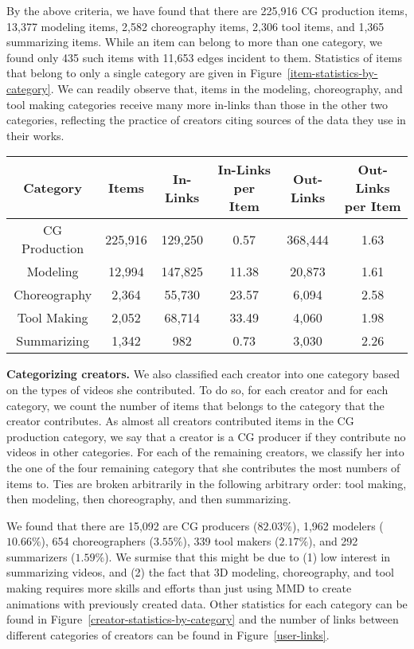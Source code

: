 \documentclass[10pt, a4paper]{article}
\begin{document}
By the above criteria, we have found that there are 225,916 CG production items, 13,377 modeling items, 2,582 choreography items, 2,306 tool items, and 1,365 summarizing items. While an item can belong to more than one category, we found only 435 such items with 11,653 edges incident to them. Statistics of items that belong to only a single category are given in Figure~\ref{item-statistics-by-category}. We can readily observe that, items in the modeling, choreography, and tool making categories receive many more in-links than those in the other two categories, reflecting the practice of creators citing sources of the data they use in their works.\medskip
\begin{figure*}[t]
	\centering
	\begin{tabular}{c|c|c|c|c|c}
		Category & Items & In-Links & In-Links per Item & Out-Links & Out-Links per Item \\
		\hline
		CG Production & 225,916 & 129,250 & 0.57 & 368,444 & 1.63\\
		Modeling & 12,994 & 147,825 & 11.38 & 20,873 & 1.61\\
		Choreography & 2,364 & 55,730 & 23.57 & 6,094 & 2.58\\
		Tool Making & 2,052 & 68,714 & 33.49 & 4,060 & 1.98\\
		Summarizing & 1,342 & 982 & 0.73 & 3,030 & 2.26
	\end{tabular}
	\caption{Statistics of items that belong to only one category. Links were counted ignoring those between items uploaded by the same creator.}
	\label{item-statistics-by-category}
\end{figure*}

{\bf Categorizing creators.} We also classified each creator into one category based on the types of videos she contributed. To do so, for each creator and for each category, we count the number of items that belongs to the category that the creator contributes. As almost all creators contributed items in the CG production category, we say that a creator is a CG producer if they contribute no videos in other categories. For each of the remaining creators, we classify her into the one of the four remaining category that she contributes the most numbers of items to. Ties are broken arbitrarily in the following arbitrary order: tool making, then modeling, then choreography, and then summarizing.

We found that there are 15,092 are CG producers ($82.03\%$), 1,962 modelers ($10.66\%$), 654 choreographers ($3.55\%$), 339 tool makers ($2.17\%$), and 292 summarizers ($1.59\%$). We surmise that this might be due to (1) low interest in summarizing videos, and (2) the fact that 3D modeling, choreography, and tool making requires more skills and efforts than just using MMD to create animations with previously created data. Other statistics for each category can be found in Figure~\ref{creator-statistics-by-category} and the number of links between different categories of creators can be found in Figure~\ref{user-links}.
\end{document}
